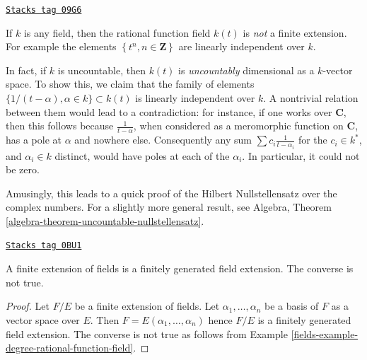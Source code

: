 \begin{example}

\label{fields-example-degree-rational-function-field}
\href{https://stacks.math.columbia.edu/tag/09G6}{\texttt{Stacks tag 09G6}}

If $k$ is any field, then the rational function field $k(t)$ is
{\it not} a finite extension. For example the elements
$\left\{t^n, n \in \mathbf{Z}\right\}$ are linearly independent over $k$.

\medskip\noindent
In fact, if $k$ is uncountable, then $k(t)$ is {\it uncountably} dimensional
as a $k$-vector space. To show this, we claim that the family of elements
$\{1/(t- \alpha), \alpha \in k\} \subset k(t)$ is linearly independent over
$k$. A nontrivial relation between them would lead to a contradiction: for
instance, if one works over $\mathbf{C}$, then this follows because
$\frac{1}{t-\alpha}$, when considered as a meromorphic function on
$\mathbf{C}$, has a pole at $\alpha$ and nowhere else.
Consequently any sum $\sum c_i \frac{1}{t - \alpha_i}$ for the $c_i \in k^*$,
and $\alpha_i \in k$ distinct, would have poles at each of the $\alpha_i$.
In particular, it could not be zero.

\medskip\noindent
Amusingly, this leads to a quick proof of the Hilbert Nullstellensatz over
the complex numbers. For a slightly more general result, see
Algebra, Theorem \ref{algebra-theorem-uncountable-nullstellensatz}.
\end{example}

\begin{lemma}
\label{fields-lemma-finite-finitely-generated}
\href{https://stacks.math.columbia.edu/tag/0BU1}{\texttt{Stacks tag 0BU1}}

A finite extension of fields is a finitely generated field extension.
The converse is not true.
\end{lemma}

\begin{proof}

Let $F/E$ be a finite extension of fields. Let $\alpha_1, \ldots, \alpha_n$
be a basis of $F$ as a vector space over $E$. Then
$F = E(\alpha_1, \ldots, \alpha_n)$ hence $F/E$ is a finitely generated
field extension. The converse is not true as follows from
Example \ref{fields-example-degree-rational-function-field}.
\end{proof}

